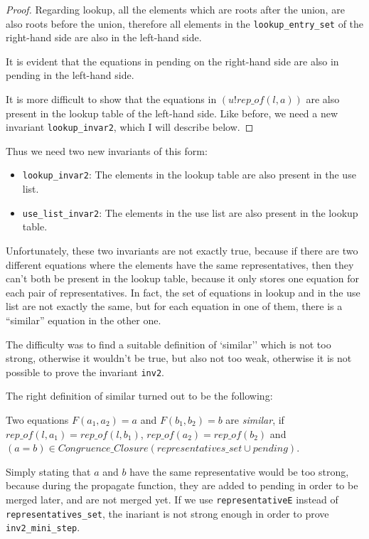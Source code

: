 \begin{proof}
Regarding lookup, all the elements which are roots after the union, are also roots before the union, therefore all elements in the \lstinline{lookup_entry_set} of the right-hand side are also in the left-hand side.

It is evident that the equations in pending on the right-hand side are also in pending in the left-hand side.

It is more difficult to show that the equations in $(u ! rep\_of(l, a))$ are also present in the lookup table of the left-hand side. Like before, we need a new invariant \lstinline{lookup_invar2}, which I will describe below.
\end{proof}

Thus we need two new invariants of this form:
\begin{itemize}
    \item \lstinline{lookup_invar2}: The elements in the lookup table are also present in the use list.
	\item \lstinline{use_list_invar2}: The elements in the use list are also present in the lookup table.
\end{itemize}

Unfortunately, these two invariants are not exactly true, because if there are two different equations where the elements have the same representatives, then they can't both be present in the lookup table, because it only stores one equation for each pair of representatives. In fact, the set of equations in lookup and in the use list are not exactly the same, but for each equation in one of them, there is a ``similar'' equation in the other one.

The difficulty was to find a suitable definition of `similar'' which is not too strong, otherwise it wouldn't be true, but also not too weak, otherwise it is not possible to prove the invariant \lstinline{inv2}.

The right definition of similar turned out to be the following:

\begin{definition}
Two equations $F(a_1, a_2) = a$ and $F(b_1, b_2) = b$ are \emph{similar}, if $rep\_of(l, a_1) = rep\_of(l, b_1)$, $rep\_of(a_2) = rep\_of(b_2)$ and $(a=b) \in Congruence\_Closure (representatives\_set \cup pending)$.
\end{definition}

Simply stating that $a$ and $b$ have the same representative would be too strong, because during the propagate function, they are added to pending in order to be merged later, and are not merged yet. If we use \lstinline{representativeE} instead of \lstinline{representatives_set}, the inariant is not strong enough in order to prove \lstinline{inv2_mini_step}.


